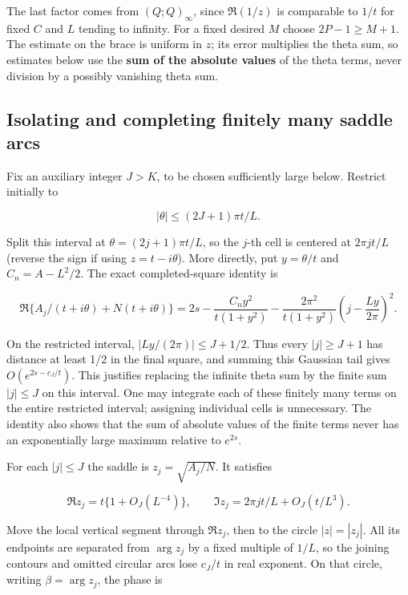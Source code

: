\documentclass[11pt,letterpaper]{article}
\begin{document}
The last factor comes from \((Q;Q)_\infty\), since \(\Re(1/z)\) is
comparable to \(1/t\) for fixed \(C\) and \(L\) tending to infinity. For
a fixed desired \(M\) choose \(2P-1\ge M+1\). The estimate on the brace
is uniform in \(z\); its error multiplies the theta sum, so
estimates below use the \textbf{sum of the absolute values} of the
theta terms, never division by a possibly vanishing theta sum.

\subsection{Isolating and completing finitely many saddle
arcs}\label{mfp:isolating-and-completing-finitely-many-saddle-arcs}

Fix an auxiliary integer \(J>K\), to be chosen sufficiently large below.
Restrict initially to

\[
 |\theta|\le(2J+1)\pi t/L.
\]

Split this interval at \(\theta=(2j+1)\pi t/L\), so the \(j\)-th cell is
centered at \(2\pi jt/L\) (reverse the sign if using \(z=t-i\theta\)).
More directly, put \(y=\theta/t\) and \(C_n=A-L^2/2\). The exact
completed-square identity is

\[
 \Re\{A_j/(t+i\theta)+N(t+i\theta)\}
 =2s-\frac{C_n y^2}{t(1+y^2)}
 -\frac{2\pi^2}{t(1+y^2)}\left(j-\frac{Ly}{2\pi}\right)^2. \tag{12a}
\]

On the restricted interval, \(|Ly/(2\pi)|\le J+1/2\). Thus every
\(|j|\ge J+1\) has distance at least 1/2 in the final square, and
summing this Gaussian tail gives \(O(e^{2s-c_J/t})\). This justifies
replacing the infinite theta sum by the finite sum \(|j|\le J\) on
this interval. One may integrate each of these finitely many terms on
the entire restricted interval; assigning individual cells is
unnecessary. The identity also shows that the sum of absolute values of
the finite terms never has an exponentially large maximum relative to
\(e^{2s}\).

For each \(|j|\le J\) the saddle is \(z_j=\sqrt{A_j/N}\). It satisfies

\[
 \Re z_j=t\{1+O_J(L^{-4})\},\qquad
 \Im z_j=2\pi jt/L+O_J(t/L^3).
\]

Move the local vertical segment through \(\Re z_j\), then to the circle
\(|z|=|z_j|\). All its endpoints are separated from \(\arg z_j\) by a
fixed multiple of \(1/L\), so the joining contours and omitted circular
arcs lose \(c_J/t\) in real exponent. On that circle, writing
\(\beta=\arg z_j\), the phase is
\end{document}
